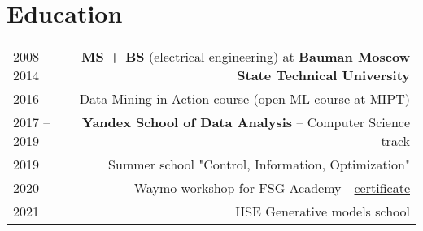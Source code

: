 \section*{Education}
\begin{tabular}{@{}L!{\VRule}R}
    2008 -- 2014 & \textbf{MS + BS} (electrical engineering) at \textbf{Bauman Moscow State Technical University} \\
    2016         & Data Mining in Action course (open ML course at MIPT)                                          \\
    2017 -- 2019 & \textbf{Yandex School of Data Analysis} -- Computer Science track    \\
    2019 & Summer school "Control, Information, Optimization" \\
    2020 & Waymo workshop for FSG Academy -  \href{https://drive.google.com/file/d/1-WxECccxBrRWIvEt9WQeXKTueiF658r7/view?usp=sharing}{certificate} \\ 
    2021 & HSE Generative models school \\
\end{tabular}